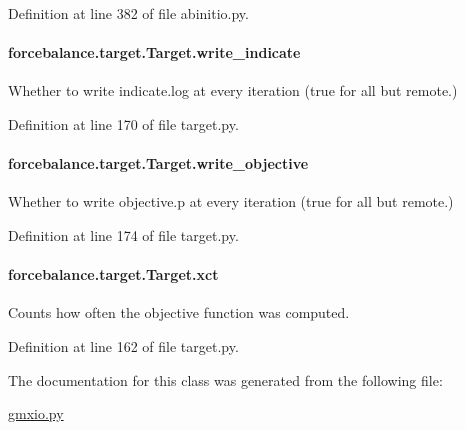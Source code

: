 Definition at line 382 of file abinitio.\-py.

\hypertarget{classforcebalance_1_1target_1_1Target_a3a2f5d4bbb8d6ecb580eadb261977a57}{
\paragraph[{write\-\_\-indicate}]{\setlength{\rightskip}{0pt plus 5cm}forcebalance.\-target.\-Target.\-write\-\_\-indicate\hspace{0.3cm}{\ttfamily [inherited]}}}\label{classforcebalance_1_1target_1_1Target_a3a2f5d4bbb8d6ecb580eadb261977a57}


Whether to write indicate.\-log at every iteration (true for all but remote.) 



Definition at line 170 of file target.\-py.

\hypertarget{classforcebalance_1_1target_1_1Target_a7a95624dfe03f0cee0e5f1ae09db306a}{
\paragraph[{write\-\_\-objective}]{\setlength{\rightskip}{0pt plus 5cm}forcebalance.\-target.\-Target.\-write\-\_\-objective\hspace{0.3cm}{\ttfamily [inherited]}}}\label{classforcebalance_1_1target_1_1Target_a7a95624dfe03f0cee0e5f1ae09db306a}


Whether to write objective.\-p at every iteration (true for all but remote.) 



Definition at line 174 of file target.\-py.

\hypertarget{classforcebalance_1_1target_1_1Target_aad2e385cfbf7b4a68f1c2cb41133fe82}{
\paragraph[{xct}]{\setlength{\rightskip}{0pt plus 5cm}forcebalance.\-target.\-Target.\-xct\hspace{0.3cm}{\ttfamily [inherited]}}}\label{classforcebalance_1_1target_1_1Target_aad2e385cfbf7b4a68f1c2cb41133fe82}


Counts how often the objective function was computed. 



Definition at line 162 of file target.\-py.



The documentation for this class was generated from the following file\-:\begin{DoxyCompactItemize}
\item 
\hyperlink{gmxio_8py}{gmxio.\-py}\end{DoxyCompactItemize}
